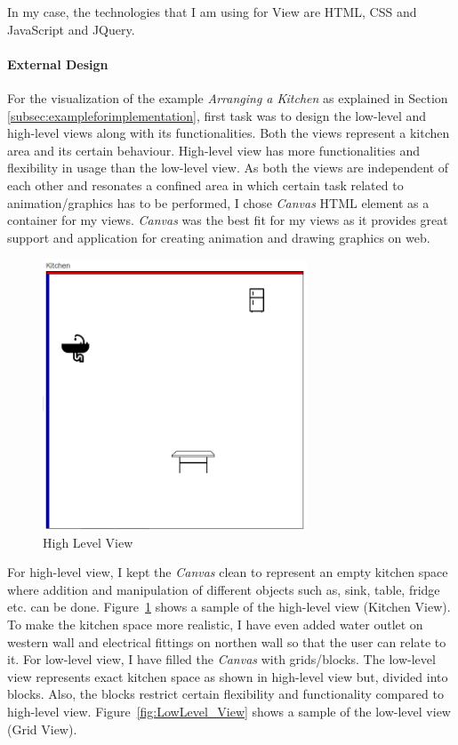 In my case, the technologies that I am using for View are HTML, CSS and JavaScript and JQuery.

\paragraph{External Design}
For the visualization of the example \textit{Arranging a Kitchen} as explained in Section \ref{subsec:exampleforimplementation}, first task was to design the low-level and high-level views along with its functionalities.
\newline\newline Both the views represent a kitchen area and its certain behaviour. High-level view has more functionalities and flexibility in usage than the low-level view. As both the views are independent of each other and resonates a confined area in which certain task related to animation/graphics has to be performed, I chose \textit{Canvas} \cite{canvas} HTML element as a container for my views. \textit{Canvas} was the best fit for my views as it provides great support and application for creating animation and drawing graphics on web.

\begin{figure}
	\includegraphics[width=0.7\textwidth]{figures/Highlevel_View}
	\caption{High Level View}
	\label{fig:HighLevel_View}
\end{figure}

For high-level view, I kept the \textit{Canvas} clean to represent an empty kitchen space where addition and manipulation of different objects such as, sink, table, fridge etc. can be done. Figure~\ref{fig:HighLevel_View} shows a sample of the high-level view (Kitchen View). To make the kitchen space more realistic, I have even added {\color{blue} water outlet} on western wall and {\color{red} electrical fittings} on northen wall so that the user can relate to it. For low-level view, I have filled the \textit{Canvas} with grids/blocks. The low-level view represents exact kitchen space as shown in high-level view but, divided into blocks. Also, the blocks restrict certain flexibility and functionality compared to high-level view. Figure~\ref{fig:LowLevel_View} shows a sample of the low-level view (Grid View).

